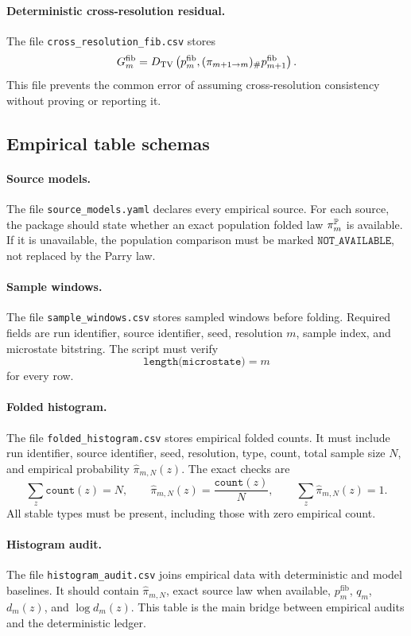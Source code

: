 \paragraph{Deterministic cross-resolution residual.}
The file \texttt{cross\_resolution\_fib.csv} stores
\[
G_m^{\mathrm{fib}}
=
D_{\mathrm{TV}}\left(
p_m^{\mathrm{fib}},
(\pi_{m+1\to m})_\#p_{m+1}^{\mathrm{fib}}
\right).
\]
This file prevents the common error of assuming cross-resolution consistency without proving or reporting it.

\subsection{Empirical table schemas}

\paragraph{Source models.}
The file \texttt{source\_models.yaml} declares every empirical source.  For each source, the package should state whether an exact population folded law \(\pi_m^{\mathbb{P}}\) is available.  If it is unavailable, the population comparison must be marked \(\texttt{NOT\_AVAILABLE}\), not replaced by the Parry law.

\paragraph{Sample windows.}
The file \texttt{sample\_windows.csv} stores sampled windows before folding.  Required fields are run identifier, source identifier, seed, resolution \(m\), sample index, and microstate bitstring.  The script must verify
\[
\texttt{length(microstate)}=m
\]
for every row.

\paragraph{Folded histogram.}
The file \texttt{folded\_histogram.csv} stores empirical folded counts.  It must include run identifier, source identifier, seed, resolution, type, count, total sample size \(N\), and empirical probability \(\widehat\pi_{m,N}(z)\).  The exact checks are
\[
\sum_z\texttt{count}(z)=N,\qquad
\widehat\pi_{m,N}(z)=\frac{\texttt{count}(z)}{N},\qquad
\sum_z\widehat\pi_{m,N}(z)=1.
\]
All stable types must be present, including those with zero empirical count.

\paragraph{Histogram audit.}
The file \texttt{histogram\_audit.csv} joins empirical data with deterministic and model baselines.  It should contain \(\widehat\pi_{m,N}\), exact source law when available, \(p_m^{\mathrm{fib}}\), \(q_m\), \(d_m(z)\), and \(\log d_m(z)\).  This table is the main bridge between empirical audits and the deterministic ledger.

